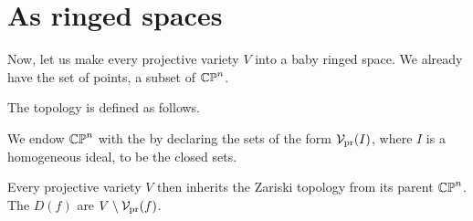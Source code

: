 \section{As ringed spaces}
Now, let us make every projective variety $V$ into a baby ringed space.
We already have the set of points, a subset of $\mathbb{CP}^n$.

The topology is defined as follows.
\begin{definition}
	We endow $\mathbb{CP}^n$ with the 
	by declaring the sets of the form $\mathcal V_{\text{pr}}(I)$,
	where $I$ is a homogeneous ideal, to be the closed sets.
	
	Every projective variety $V$ then inherits the Zariski
	topology from its parent $\mathbb{CP}^n$.
	The  $D(f)$ are $V \setminus \mathcal V_{\text{pr}}(f)$.
\end{definition}

